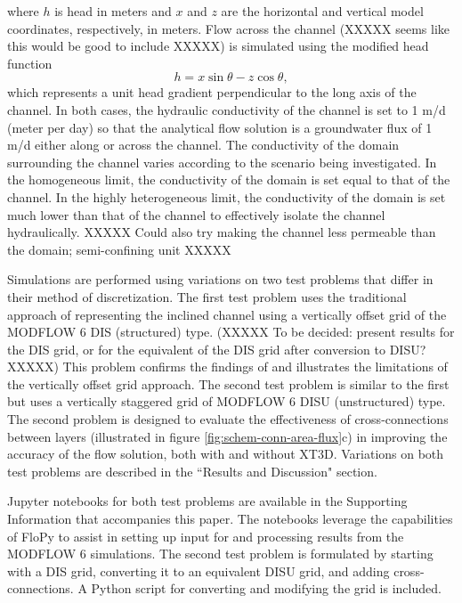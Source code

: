 \documentclass{article}
\begin{document}
\noindent where $h$ is head in meters and $x$ and $z$ are the horizontal and vertical model coordinates, respectively, in meters. Flow across the channel (XXXXX seems like this would be good to include XXXXX) is simulated using the modified head function
\begin{equation}
\label{eqn:head_analyt_across}
h = x \sin \theta - z \cos \theta,
\end{equation}
which represents a unit head gradient perpendicular to the long axis of the channel. In both cases, the hydraulic conductivity of the channel is set to 1 m/d (meter per day) so that the analytical flow solution is a groundwater flux of 1 m/d either along or across the channel. The conductivity of the domain surrounding the channel varies according to the scenario being investigated. In the homogeneous limit, the conductivity of the domain is set equal to that of the channel. In the highly heterogeneous limit, the conductivity of the domain is set much lower than that of the channel to effectively isolate the channel hydraulically. XXXXX Could also try making the channel less permeable than the domain; semi-confining unit XXXXX

Simulations are performed using variations on two test problems that differ in their method of discretization. The first test problem uses the traditional approach of representing the inclined channel using a vertically offset grid of the MODFLOW 6 DIS (structured) type. (XXXXX To be decided: present results for the DIS grid, or for the equivalent of the DIS grid after conversion to DISU? XXXXX) This problem confirms the findings of \cite{bardot2022} and illustrates the limitations of the vertically offset grid approach. The second test problem is similar to the first but uses a vertically staggered grid of MODFLOW 6 DISU (unstructured) type. The second problem is designed to evaluate the effectiveness of cross-connections between layers (illustrated in figure \ref{fig:schem-conn-area-flux}c) in improving the accuracy of the flow solution, both with and without XT3D. Variations on both test problems are described in the ``Results and Discussion" section.

Jupyter notebooks for both test problems are available in the Supporting Information that accompanies this paper. The notebooks leverage the capabilities of FloPy \citep{bakker2016scripting} to assist in setting up input for and processing results from the MODFLOW 6 simulations. The second test problem is formulated by starting with a DIS grid, converting it to an equivalent DISU grid, and adding cross-connections. A Python script for converting and modifying the grid is included.
\end{document}
